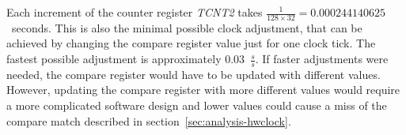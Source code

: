 Each increment of the counter register {\it{TCNT2}} takes
$\frac{1}{128 \times 32} = 0.000244140625$~seconds.
This is also the minimal possible clock adjustment,
that can be achieved by changing the compare register value just for one clock tick.
The fastest possible adjustment is approximately 0.03~$\frac{s}{s}$.
If faster adjustments were needed, the compare register would have to be updated with different values. 
However, updating the compare register with more different values would require
a more complicated software design
and lower values could cause a miss of the compare match described in section~\ref{sec:analysis-hwclock}.


